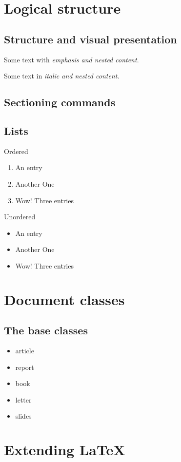 \documentclass{article}
\begin{document}
\section{Logical structure}
\subsection{Structure and visual presentation}

Some text with \emph{emphasis and \emph{nested} content}.

Some text in \textit{italic and \textit{nested} content}.

\subsection{Sectioning commands}
\subsection{Lists}

Ordered
\begin{enumerate}
  \item An entry
  \item Another One
  \item Wow! Three entries
\end{enumerate}

Unordered
\begin{itemize}
  \item An entry
  \item Another One
  \item Wow! Three entries
\end{itemize}

\section{Document classes}
\subsection{The base classes}
\begin{itemize}
  \item article
  \item report
  \item book
  \item letter
  \item slides

\end{itemize}

\section{Extending LaTeX}
\end{document}
